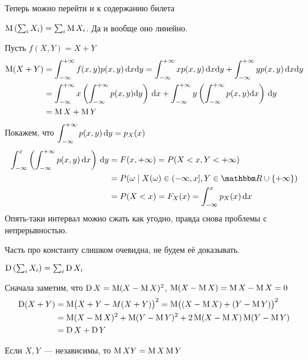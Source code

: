 \documentclass[12pt,ebook]{../../../notes}
\begin{document}
Теперь можно перейти и к содержанию билета
\begin{prop}\label{prop:stat::randsum::exp}
  $\operatorname{M} \left(\sum_i X_i\right) = \sum_i \operatorname{M} X_i $. Да и вообще оно линейно.
\end{prop}
\begin{itlproof}
  Пусть $f(X,Y)= X+Y$
  \[
    \begin{split}
      \operatorname{M} (X+Y) &= \int_{-\infty}^{+\infty} f(x,y) p(x,y)\, \mathrm{d} x\mathrm{d} y 
      = \int_{-\infty}^{+\infty} x p(x,y)\, \mathrm{d} x \mathrm{d} y + \int_{-\infty}^{+\infty} y p(x,y)\, \mathrm{d} x \mathrm{d} y \\
      &= \int_{-\infty}^{+\infty} x 
      \left(\int_{-\infty}^{+\infty} p(x,y) \mathrm{d} y\right)\, \mathrm{d} x + \int_{-\infty}^{+\infty} y \left(\int_{-\infty}^{+\infty} p(x,y) \mathrm{d} x\right)\,\mathrm{d} y \\
      &= \operatorname{M} X + \operatorname{M} Y
    \end{split}
  \]
  Покажем, что $\displaystyle\int_{-\infty}^{+\infty} p(x,y) \,\mathrm{d} y = p_X(x)$
  \[
    \begin{split}
      \int_{-\infty}^x \left(\intR p(x,y) \,\del x\right) \, \del y &= F(x, +\infty) = 
      P(X<x, Y<+\infty) \\
      &= P({\omega\mid X(\omega)\in (-\infty, x], Y\in \R\cup\{+\infty\}}) \\
      &= P(X<x) = F_X(x) = \int_{-\infty}^x p_X(x) \, \del x
    \end{split}
  \]
  Опять-таки интервал можно сжать как угодно, правда снова проблемы с непрерывностью.

  Часть про константу слишком очевидна, не будем её доказывать. 
\end{itlproof}

\begin{prop}\label{prop:stat::randsum::var}
  $\operatorname{D} \left(\sum_i X_i\right) = \sum_i \operatorname{D} X_i$
\end{prop}
\begin{itlproof}
  Сначала заметим, что $\operatorname{D} X = \operatorname{M} (X- \operatorname{M} X)^2$, $\operatorname{M} (X - \operatorname{M} X) = \operatorname{M} X - \operatorname{M} X = 0$
  \[
    \begin{split}
      \operatorname{D} (X+Y) &= \operatorname{M} \bigl(X+Y - M(X+Y)\bigr)^2 = \operatorname{M} \bigl((X-\operatorname{M} X) +(Y-\operatorname{M} Y) \bigr)^2 \\
                 &= \operatorname{M} (X-\operatorname{M} X)^2 + \operatorname{M} (Y-\operatorname{M} Y)^2 + 2 \operatorname{M} (X-\operatorname{M} X) \operatorname{M} (Y - \operatorname{M} Y)\\ 
                 &= \operatorname{D} X + \operatorname{D} Y
    \end{split}
  \]
\end{itlproof}

\begin{prop}\label{prop:stat::randsum::expmul}
  Если $X,Y$~--- независимы, то $\operatorname{M} XY = \operatorname{M} X \operatorname{M} Y$
\end{prop}
%
\end{document}
